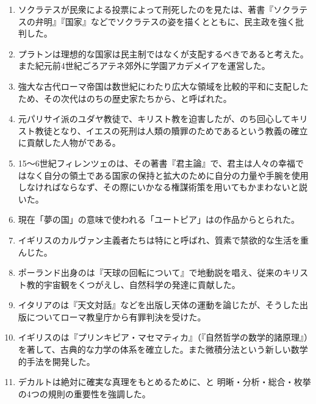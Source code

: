 \documentclass[uplatex,dvipdfmx]{jsarticle}
\begin{document}
\begin{enumerate}


\item ソクラテスが民衆による投票によって刑死したのを見た\anaume{}は、著書『ソクラテスの弁明』『国家』などでソクラテスの姿を描くとともに、民主政を強く批判した。
 
   \item プラトンは理想的な国家は民主制ではなく{\anaume{}}が支配するべきであると考えた。また紀元前4世紀ごろアテネ郊外に学園アカデメイアを運営した。

\item 強大な古代ローマ帝国は数世紀にわたり広大な領域を比較的平和に支配したため、その次代はのちの歴史家たちから、\anaume{}と呼ばれた。
  
\item   元パリサイ派のユダヤ教徒で、キリスト教を迫害したが、のち回心してキリスト教徒となり、イエスの死刑は人類の贖罪のためであるという教義の確立に貢献した人物が\anaume{}である。

\item 15〜6世紀フィレンツェの\anaume{}は、その著書『君主論』で、君主は人々の幸福ではなく自分の領土である国家の保持と拡大のために自分の力量や手腕を使用しなければならなず、その際にいかなる権謀術策を用いてもかまわないと説いた。

\item 現在「夢の国」の意味で使われる「ユートピア」は\anaume{}の作品からとられた。
  
\item イギリスのカルヴァン主義者たちは特に\anaume{}と呼ばれ、質素で禁欲的な生活を重んじた。

\item ポーランド出身の\anaume{}は『天球の回転について』で地動説を唱え、従来のキリスト教的宇宙観をくつがえし、自然科学の発達に貢献した。

\item イタリアの\anaume{}は『天文対話』などを出版し天体の運動を論じたが、そうした出版についてローマ教皇庁から有罪判決を受けた。

\item イギリスの\anaume{}は『プリンキピア・マセマティカ』（『自然哲学の数学的諸原理』）を著して、古典的な力学の体系を確立した。また微積分法という新しい数学的手法を開発した。

\item デカルトは絶対に確実な真理をもとめるために、\anaume{}と
明晰・分析・総合・枚挙の4つの規則の重要性を強調した。



\end{enumerate}
\end{document}
